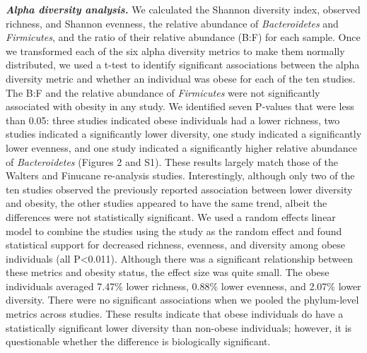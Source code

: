 \documentclass[12pt,]{article}
\begin{document}
\textbf{\emph{Alpha diversity analysis.}} We calculated the Shannon
diversity index, observed richness, and Shannon evenness, the relative
abundance of \emph{Bacteroidetes} and \emph{Firmicutes}, and the ratio
of their relative abundance (B:F) for each sample. Once we transformed
each of the six alpha diversity metrics to make them normally
distributed, we used a t-test to identify significant associations
between the alpha diversity metric and whether an individual was obese
for each of the ten studies. The B:F and the relative abundance of
\emph{Firmicutes} were not significantly associated with obesity in any
study. We identified seven P-values that were less than 0.05: three
studies indicated obese individuals had a lower richness, two studies
indicated a significantly lower diversity, one study indicated a
significantly lower evenness, and one study indicated a significantly
higher relative abundance of \emph{Bacteroidetes} (Figures 2 and S1).
These results largely match those of the Walters and Finucane
re-analysis studies. Interestingly, although only two of the ten studies
observed the previously reported association between lower diversity and
obesity, the other studies appeared to have the same trend, albeit the
differences were not statistically significant. We used a random effects
linear model to combine the studies using the study as the random effect
and found statistical support for decreased richness, evenness, and
diversity among obese individuals (all P\textless{}0.011). Although
there was a significant relationship between these metrics and obesity
status, the effect size was quite small. The obese individuals averaged
7.47\% lower richness, 0.88\% lower evenness, and 2.07\% lower
diversity. There were no significant associations when we pooled the
phylum-level metrics across studies. These results indicate that obese
individuals do have a statistically significant lower diversity than
non-obese individuals; however, it is questionable whether the
difference is biologically significant.
\end{document}
